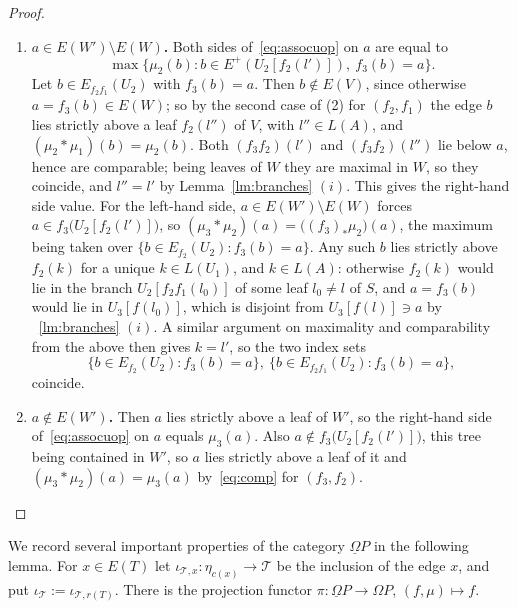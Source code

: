 \documentclass{amsart}
\theoremstyle{definition}
\theoremstyle{remark}
\newcommand{\lb}{\lbrace}
\newcommand{\rb}{\rbrace}
\begin{document}
\begin{proof}
\begin{enumerate}[label=(\roman*)]
		\item \textbf{$a\in E(W')\setminus E(W)$.} 
		Both sides of~\eqref{eq:assocuop} on $a$ are equal to
		\[
			\max\lb\mu_2(b)\colon b\in E^{+}(U_2[f_2(l')]),\ f_3(b)=a\rb.
		\]
		Let $b\in E_{f_2f_1}(U_2)$ with $f_3(b)=a$. Then $b\notin E(V)$, since otherwise
		$a=f_3(b)\in E(W)$; so by the second case of (2) for $(f_2,f_1)$ the edge $b$ lies
		strictly above a leaf $f_2(l'')$ of $V$, with $l''\in L(A)$, and $(\mu_2*\mu_1)(b)=\mu_2(b)$.
		Both $(f_3f_2)(l')$ and $(f_3f_2)(l'')$ lie below $a$, hence are comparable; being leaves of $W$ they are maximal in $W$, so they coincide, and $l''=l'$ by Lemma~\ref{lm:branches} $(i)$. 
		This gives the right-hand side value. 
		For the left-hand side, $a\in E(W')\setminus E(W)$ forces
		$a\in f_3\bigl(U_2[f_2(l')]\bigr)$, so $(\mu_3*\mu_2)(a)=\bigl((f_3)_*\mu_2\bigr)(a)$, the
		maximum being taken over $\lb b\in E_{f_2}(U_2)\colon f_3(b)=a\rb$. 
		Any such $b$ lies strictly above
		$f_2(k)$ for a unique $k\in L(U_1)$, and $k\in L(A)$: otherwise $f_2(k)$ would lie in the branch $U_2[f_2f_1(l_0)]$ of some leaf $l_0\ne l$ of $S$, and $a=f_3(b)$ would lie in
		$U_3[f(l_0)]$, which is disjoint from $U_3[f(l)]\ni a$ by ~\ref{lm:branches} $(i)$. 
		A similar argument on maximality and comparability from the above then gives $k=l'$, so the two index sets
		\[
			\lb b\in E_{f_2}(U_2)\colon f_3(b)=a\rb,\ 
			\lb b\in E_{f_2 f_{1}}(U_2)\colon f_3(b)=a\rb,
		\]
		coincide.
		
		\item \textbf{$a\notin E(W')$.} Then $a$ lies strictly above a leaf of $W'$, so the right-hand side of~\eqref{eq:assocuop} on $a$ equals
		$\mu_3(a)$. 
		Also $a\notin f_3\bigl(U_2[f_2(l')]\bigr)$, this tree being contained in $W'$, so $a$
		lies strictly above a leaf of it and $(\mu_3*\mu_2)(a)=\mu_3(a)$ by~\eqref{eq:comp} for $(f_3,f_2)$.
		\end{enumerate}
	\end{proof}

	We record several important properties of the category $\underline{\Omega} P$ in the following lemma.
	For $x\in E(T)$ let $\iota_{\mathcal{T},x}\colon\eta_{c(x)}\to\mathcal{T}$ be the inclusion of
	the edge $x$, and put $\iota_{\mathcal{T}}:=\iota_{\mathcal{T},r(T)}$.
	There is the projection functor $\pi\colon \underline{\Omega} P\to\Omega P$, $(f,\mu)\mapsto f$.
	
\end{document}
